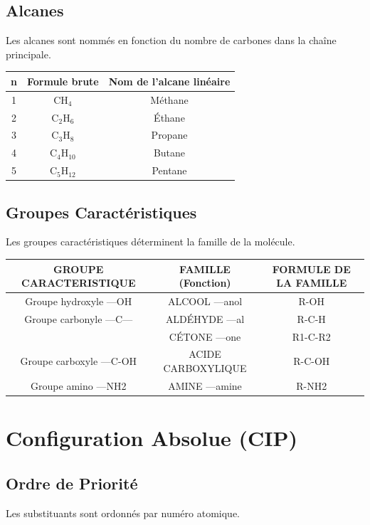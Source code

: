 \documentclass[12pt]{article}
\begin{document}
\subsection{Alcanes}
Les alcanes sont nommés en fonction du nombre de carbones dans la chaîne principale.

\begin{center}
\begin{tabular}{|c|c|c|}
\hline
n & Formule brute & Nom de l'alcane linéaire \\ \hline
1 & $\mathrm{CH_4}$ & Méthane \\ \hline
2 & $\mathrm{C_2H_6}$ & Éthane \\ \hline
3 & $\mathrm{C_3H_8}$ & Propane \\ \hline
4 & $\mathrm{C_4H_{10}}$ & Butane \\ \hline
5 & $\mathrm{C_5H_{12}}$ & Pentane \\ \hline
\end{tabular}
\end{center}

\subsection{Groupes Caractéristiques}
Les groupes caractéristiques déterminent la famille de la molécule.

\begin{center}
\begin{tabular}{|c|c|c|}
\hline
GROUPE CARACTERISTIQUE & FAMILLE (Fonction) & FORMULE DE LA FAMILLE \\ \hline
Groupe hydroxyle —OH & ALCOOL —anol & R-OH \\ \hline
Groupe carbonyle —C— & ALDÉHYDE —al & R-C-H \\ \hline
 & CÉTONE —one & R1-C-R2 \\ \hline
Groupe carboxyle —C-OH & ACIDE CARBOXYLIQUE & R-C-OH \\ \hline
Groupe amino —NH2 & AMINE —amine & R-NH2 \\ \hline
\end{tabular}
\end{center}

\section{Configuration Absolue (CIP)}
\subsection{Ordre de Priorité}
Les substituants sont ordonnés par numéro atomique.
\end{document}
